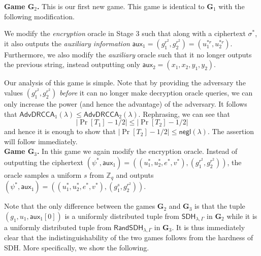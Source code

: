\documentclass[10pt,a4paper]{article}
\newcommand{\negl}{\mathsf{negl}}
\newcommand{\aux}{\mathsf{aux}}
\newcommand{\drcca}{\mathsf{AdvDRCCA}}
\newcommand{\game}{\mathbf{G}}
\newcommand{\randsdh}{\mathsf{RandSDH}}
\newcommand{\sdh}{\mathsf{SDH}}
\begin{document}
	\textbf{Game $\game_2$.} This is our first new game. This game is identical to $\game_1$ with the following modification.
	
	We modify the \textit{encryption} oracle in Stage $3$ such that along with a ciphertext $\sigma^{*}$, it also outputs the \textit{auxiliary information} $\aux_1 = (g_1^{r^2}, g_2^{r^2}) = (u_1^{*r}, u_2^{*r})$. Furthermore, we also modify the \textit{auxiliary} oracle such that it no longer outputs the previous string, instead outputting only $\aux_2 = (x_1,x_2,y_1,y_2)$. 
	
	Our analysis of this game is simple. Note that by providing the adversary the values $(g_1^{r^2}, g_2^{r^2})$ \textit{before} it can no longer make decryption oracle queries, we can only increase the power (and hence the advantage) of the adversary. It follows that $\drcca_1(\lambda)\leq\drcca_2(\lambda)$. Rephrasing, we can see that $$|\Pr[T_1]-1/2|\leq|\Pr[T_2]-1/2|$$ and hence it is enough to show that $|\Pr[T_2]-1/2|\leq\negl(\lambda)$. The assertion will follow immediately.\\
	
	\textbf{Game $\game_3$.} In this game we again modify the encryption oracle. Instead of outputting the ciphertext $(\psi^{*}, \aux_1) = ((u_1^{*}, u_2^{*}, e^{*}, v^{*}), (g_1^{r^2}, g_2^{r^2}))$, the oracle samples a uniform $s$ from $\mathbb{Z}_{q}$ and outputs $(\psi^{*}, \aux_1) = ((u_1^{*}, u_2^{*}, e^{*}, v^{*}), (g_1^{s}, g_2^{r^2}))$. 
	
	Note that the only difference between the games $\game_2$ and $\game_3$ is that the tuple $(g_1, u_1, \aux_1[0])$ is a uniformly distributed tuple from $\sdh_{\lambda,\Gamma}$ in $\game_2$ while it is a uniformly distributed tuple from $\randsdh_{\lambda,\Gamma}$ in $\game_3$. It is thus immediately clear that the indistinguishability of the two games follows from the hardness of SDH. More specifically, we show the following.
	
\end{document}
